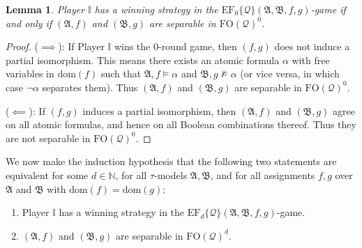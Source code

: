 \documentclass{article}
\newtheorem{lemma}[theorem]{Lemma}
\theoremstyle{definition}
\begin{document}
\begin{lemma}\label{lem:basecase}
    Player $\mathbb{I}$ has a winning strategy in the $\mathrm{EF}_0\{\mathcal{Q}\}(\mathfrak{A},\mathfrak{B},f,g)$-game if and only if $(\mathfrak{A},f)$ and $(\mathfrak{B},g)$ are separable in $\mathrm{FO}(\mathcal{Q})^0$.
\end{lemma}
\begin{proof}
    ($\implies$): If Player $\mathbb{I}$ wins the $0$-round game, then $(f,g)$ does not induce a partial isomorphism. This means there exists an atomic formula $\alpha$ with free variables in $\mathrm{dom}(f)$ such that $\mathfrak{A},f\models\alpha$ and $\mathfrak{B},g\not\models\alpha$ (or vice versa, in which case $\neg\alpha$ separates them). Thus $(\mathfrak{A},f)$ and $(\mathfrak{B},g)$ are separable in $\mathrm{FO}(\mathcal{Q})^0$.

    ($\impliedby$): If $(f,g)$ induces a partial isomorphism, then $(\mathfrak{A},f)$ and $(\mathfrak{B},g)$ agree on all atomic formulas, and hence on all Boolean combinations thereof. Thus they are not separable in $\mathrm{FO}(\mathcal{Q})^0$.
\end{proof}

We now make the induction hypothesis that the following two statements are
equivalent for some $d\in\mathbb{N}$, for all $\tau$-models
$\mathfrak{A},\mathfrak{B}$, and for all assignments $f,g$ over
$\mathfrak{A}$ and $\mathfrak{B}$ with
$\mathrm{dom}(f)=\mathrm{dom}(g)$:
\begin{enumerate}
    \item Player $\mathbb{I}$ has a winning strategy in the $\mathrm{EF}_d\{\mathcal{Q}\}(\mathfrak{A},\mathfrak{B},f,g)$-game.
    \item $(\mathfrak{A},f)$ and $(\mathfrak{B},g)$ are separable in $\mathrm{FO}(\mathcal{Q})^d$.
\end{enumerate}
\end{document}
